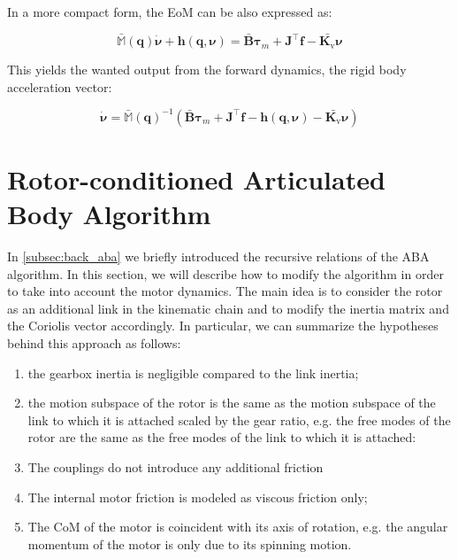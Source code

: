 In a more compact form, the \ac{EoM} can be also expressed as:

\begin{equation}
    \mathbb{\bar{M}}(\mathbf{q})\dot{\boldsymbol{\nu}} + \mathbf{h}(\mathbf{q},\boldsymbol{\nu}) = \mathbf{\bar{B}}\boldsymbol{\tau} _m + \mathbf{J} ^\top \mathbf{f} - \bar{\mathbf{K} _{\mathrm{v}}}\boldsymbol{\nu}
\end{equation}

This yields the wanted output from the forward dynamics, the rigid body acceleration vector:

\begin{equation}
    \dot{\boldsymbol{\nu}} = \mathbb{\bar{M}}(\mathbf{q}) ^{-1} (\mathbf{\bar{B}}\boldsymbol{\tau} _m + \mathbf{J} ^\top \mathbf{f} - \mathbf{h}(\mathbf{q},\boldsymbol{\nu}) - \bar{\mathbf{K} _{\mathrm{v}}}\boldsymbol{\nu})
\end{equation}

\section{Rotor-conditioned Articulated Body Algorithm}

In \cref{subsec:back_aba} we briefly introduced the recursive relations of the \ac{ABA} algorithm. In this section, we will describe how to modify the algorithm in order to take into account the motor dynamics. The main idea is to consider the rotor as an additional link in the kinematic chain and to modify the inertia matrix and the Coriolis vector accordingly. In particular, we can summarize the hypotheses behind this approach as follows:

\begin{enumerate}
    \item the gearbox inertia is negligible compared to the link inertia;
    \item the motion subspace of the rotor is the same as the motion subspace of the link to which it is attached scaled by the gear ratio, e.g. the free modes of the rotor are the same as the free modes of the link to which it is attached:
    \item The couplings do not introduce any additional friction
    \item The internal motor friction is modeled as viscous friction only;
    \item The \ac{CoM} of the motor is coincident with its axis of rotation, e.g. the angular momentum of the motor is only due to its spinning motion.
\end{enumerate}

